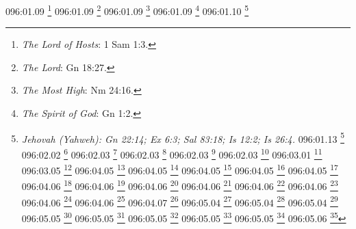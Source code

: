 {{{{{{{{{{{{{{{096:01.09 \footnote{\textit{The Lord of Hosts}: 1 Sam 1:3.}
096:01.09 \footnote{\textit{The Lord}: Gn 18:27.}
096:01.09 \footnote{\textit{The Most High}: Nm 24:16.}
096:01.09 \footnote{\textit{The Spirit of God}: Gn 1:2.}
096:01.10 \footnote{\textit{Jehovah (Yahweh): Gn 22:14; Ex 6:3; Sal 83:18; Is 12:2; Is 26:4.}
096:01.13 \footnote{\textit{Their gods are gods of hills}: 1 Re 20:23.}
096:02.02 \footnote{\textit{Flow with milk and honey}: Ex 3:8,17.}
096:02.03 \footnote{\textit{Children of Israel}: Gn 32:32; Gn 45:21.}
096:02.03 \footnote{\textit{Chosen people}: 1 Re 3:8; 1 Cr 17:21-22; Sal 33:12; Sal 105:6,43; Sal 135:4,; Is 41:8-9; Is 43:20-21; Is 44:1; Dt 7:6; Dt 14:2.}
096:02.03 \footnote{\textit{Hebrews}: Gn 40:15.}
096:02.03 \footnote{\textit{Jews}: 2 Re 16:6.}
096:03.01 \footnote{\textit{Moses' parents}: Ex 2:1-10.}
096:03.05 \footnote{\textit{The Exodus}: Ex 14:8-29.}
096:04.05 \footnote{\textit{Devouring fire}: Ex 24:17; Is 29:6; Is 30:27,30.}
096:04.05 \footnote{\textit{Fearful}: Dt 28:58.}
096:04.05 \footnote{\textit{Mighty, terrible}: Neh 9:32; Jer 20:11; Dt 7:21; Dt 10:17.}
096:04.05 \footnote{\textit{Mountain of Yahweh on fire}: Ex 19:18.}
096:04.05 \footnote{\textit{Powerful}: Sal 29:4.}
096:04.06 \footnote{\textit{Eternal God is my refuge}: Dt 33:27.}
096:04.06 \footnote{\textit{God of Jacob is my refuge}: Sal 46:7,11.}
096:04.06 \footnote{\textit{God of spirits of all flesh}: Nm 16:22; Nm 27:16.}
096:04.06 \footnote{\textit{God will not forsake or destroy}: Dt 4:31.}
096:04.06 \footnote{\textit{Jealous for}: Ez 39:25; Jl 2:18; Zac 1:14; Zac 8:2.}
096:04.06 \footnote{\textit{Jealous God}: Ex 20:5; Dt 6:15.}
096:04.06 \footnote{\textit{Jealous of}: Ex 34:14; Nah 1:2; Dt 4:24; Dt 5:9; Jos 24:19.}
096:04.06 \footnote{\textit{Nor forget the covenant}: Dt 7:8.}
096:04.07 \footnote{\textit{God of truth & w/o iniquity}: Dt 32:4.}
096:05.04 \footnote{\textit{He will love you, bless you}: Dt 7:13-15.}
096:05.04 \footnote{\textit{Lend to many nations}: Dt 15:6.}
096:05.04 \footnote{\textit{Remember the Lord your God}: Dt 8:18.}
096:05.05 \footnote{\textit{Pt 1: The Lord is one God}: Dt 6:4.}
096:05.05 \footnote{\textit{Pt 2: There is none beside}: Dt 4:35,39.}
096:05.05 \footnote{\textit{The Lord is one God}: 2 Re 19:19; 1 Cr 17:20; Neh 9:6; Sal 86:10; Eclo 36:5; Is 37:16; Is 44:6,8; Is 45:5-6,21; Mc 12:29,32; Jn 17:3; Ro 3:30; 1 Co 8:4-6; Gl 3:20; Ef 4:6; 1 Ti 2:5; Stg 2:19; 1 Sam 2:2; 2 Sam 7:22.}
096:05.05 \footnote{\textit{Who is like our God among all}: Ex 15:11.}
096:05.05 \footnote{\textit{You saw no similitude the day}: Dt 4:15.}
096:05.06 \footnote{\textit{Chosen people of God}: 1 Re 3:8; 1 Cr 17:21-22; Sal 33:12; Sal 105:6,43; Sal 135:4; Is 41:8-9; Is 43:20-21; Is 44:1; Dt 7:6; Dt 14:2.}
}}}}}}}}}}}}}}}}
